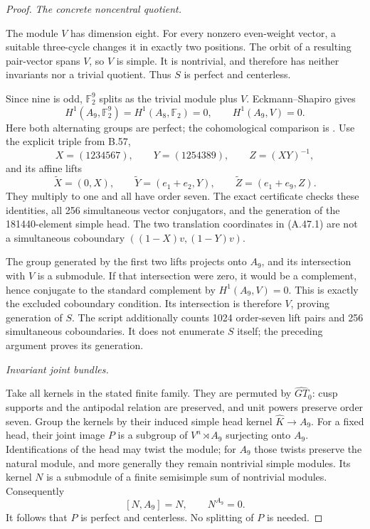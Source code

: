 \begin{proof}
\emph{The concrete noncentral quotient.}\par
The module \(V\) has dimension eight. For every
nonzero even-weight vector, a suitable three-cycle
changes it in exactly two positions. The orbit of
a resulting pair-vector spans \(V\), so \(V\)
is simple. It is nontrivial, and therefore has
neither invariants nor a trivial quotient. Thus
\(S\) is perfect and centerless.

Since nine is odd, \(\mathbb F_2^9\) splits as the
trivial module plus \(V\). Eckmann--Shapiro gives
\[
 H^1(A_9,\mathbb F_2^9)
       =H^1(A_8,\mathbb F_2)=0,
 \qquad H^1(A_9,V)=0.
\]
Here both alternating groups are perfect; the
cohomological comparison is
\citet[Proposition~3.3]{ABrown2010}.
Use the explicit triple from B.57,
\[
 X=(1234567),\qquad Y=(1254389),
 \qquad Z=(XY)^{-1},
\]
and its affine lifts
\[
 \widetilde X=(0,X),\qquad
 \widetilde Y=(e_1+e_2,Y),\qquad
 \widetilde Z=(e_1+e_9,Z).
 \tag{A.47.1}
\]
They multiply to one and all have order seven.
The exact certificate
checks these identities, all 256 simultaneous
vector conjugators, and the generation of the
181440-element simple head. The two translation
coordinates in (A.47.1) are not a simultaneous
coboundary \(((1-X)v,(1-Y)v)\).

The group generated by the first two lifts projects
onto \(A_9\), and its intersection with \(V\) is
a submodule. If that intersection were zero,
it would be a complement, hence conjugate to the
standard complement by \(H^1(A_9,V)=0\). This is
exactly the excluded coboundary condition. Its
intersection is therefore \(V\), proving generation
of \(S\). The script additionally counts 1024
order-seven lift pairs and 256 simultaneous
coboundaries. It does not enumerate \(S\) itself;
the preceding argument proves its generation.

\emph{Invariant joint bundles.}\par
Take all kernels in the stated finite family.
They are permuted by \(\widehat{GT}_0\): cusp
supports and the antipodal relation are preserved,
and unit powers preserve order seven. Group the
kernels by their induced simple head kernel
\(\widehat K\to A_9\). For a fixed head, their
joint image \(P\) is a subgroup of
\(V^n\rtimes A_9\) surjecting onto \(A_9\).
Identifications of the head may twist the module;
for \(A_9\) those twists preserve the natural
module, and more generally they remain nontrivial
simple modules. Its kernel \(N\) is a submodule
of a finite semisimple sum of nontrivial modules.
Consequently
\[
                 [N,A_9]=N,
 \qquad N^{A_9}=0.
\]
It follows that \(P\) is perfect and centerless.
No splitting of \(P\) is needed.


\end{proof}
